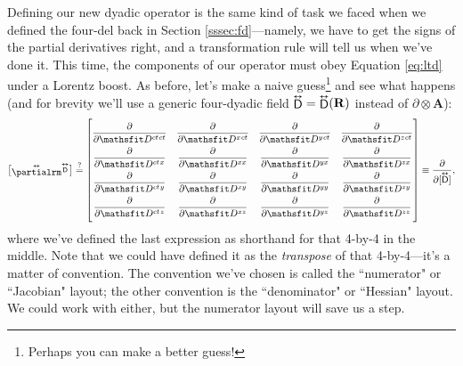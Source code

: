 \documentclass[12pt]{article}
\renewcommand{\vv}[1]{\mathbf{#1}}
\newcommand{\tightoverset}[2]{%
  \mathop{#2}\limits^{\vbox to -.5ex{\kern-0.75ex\hbox{$#1$}\vss}}}
\newcommand{\inlinedy}[1]{\tightoverset{\text{\tiny$\bm\leftrightarrow$}}{#1}}
\newcommand{\superoverset}[2]{%
  \mathop{#2}\limits^{\vbox to -.5ex{\kern-0.95ex\hbox{$#1$}\vss}}}
\newcommand{\superdy}[1]{\superoverset{\text{\tiny$\bm\leftrightarrow$}}{#1}}
\newcommand{\capdy}[1]{ \overset{ \text{\tiny$\bm\leftrightarrow$} }{\vphantom{\text{\small{A}}}\smash{#1}} }
\begin{document}
Defining our new dyadic operator is the same kind of task we faced when we defined the four-del back in Section \ref{sssec:fd}---namely, we have to get the signs of the partial derivatives right, and a transformation rule will tell us when we've done it. This time, the components of our operator must obey Equation \ref{eq:ltd} under a Lorentz boost. As before, let's make a naive guess\footnote{Perhaps you can make a better guess!} and see what happens (and for brevity we'll use a generic four-dyadic field $\inlinedy{\mathsf{D}} = \inlinedy{\mathsf{D}} (\vv R)$ instead of $\partialup \otimes \vv A$):
\begin{equation*}
\begin{bmatrix}
\capdy{\partialrm} {}^{\superdy{\mathsf{D}}} \\[-.375ex]
\end{bmatrix}
\stackrel{?}{=}
\begin{bmatrix}
\\[-2ex]
\dfrac{\partial}{\partial \mathsfit D^{ct \mkern1.5mu ct}} & \dfrac{\partial}{\partial \mathsfit D^{x \mkern1.5mu ct}} & \dfrac{\partial}{\partial \mathsfit D^{y \mkern1.5mu ct}} & \dfrac{\partial}{\partial \mathsfit D^{z \mkern1.5mu ct}} \\[2ex]
\dfrac{\partial}{\partial \mathsfit D^{ct \mkern1.5mu x}} & \dfrac{\partial}{\partial \mathsfit D^{x x}} & \dfrac{\partial}{\partial \mathsfit D^{y x}} & \dfrac{\partial}{\partial \mathsfit D^{z x}}  \\[2ex]
\dfrac{\partial}{\partial \mathsfit D^{ct \mkern1.5mu y}} & \dfrac{\partial}{\partial \mathsfit D^{x y}} & \dfrac{\partial}{\partial \mathsfit D^{y y}} & \dfrac{\partial}{\partial \mathsfit D^{z y}}  \\[2ex]
\dfrac{\partial}{\partial \mathsfit D^{ct \mkern1.5mu z}} & \dfrac{\partial}{\partial \mathsfit D^{x z}} & \dfrac{\partial}{\partial \mathsfit D^{y z}} & \dfrac{\partial}{\partial \mathsfit D^{z z}} \\[2ex]
\end{bmatrix}
\equiv
\dfrac{\partial}{\partial [ \capdy{\mathsf{D}} ]}
,
\end{equation*}
where we've defined the last expression as shorthand for that 4-by-4 in the middle. Note that we could have defined it as the \emph{transpose} of that 4-by-4---it's a matter of convention. The convention we've chosen is called the ``numerator" or ``Jacobian" layout; the other convention is the ``denominator" or ``Hessian" layout. We could work with either, but the numerator layout will save us a step.
\end{document}

